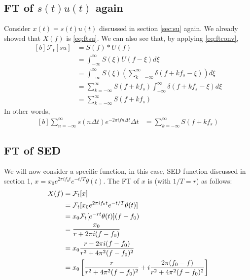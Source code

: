 \documentclass[letterpaper, 11pt]{article}
\newcommand{\fint}{\int_{-\infty}^{\infty}} %
\newcommand{\sed}[2]{#2_{0}e^{2\pi if_{0}#1}e^{-#1/T} \theta (#1)} %
\newcommand{\fsum}[1]{\sum_{#1 = -\infty}^{\infty}} %
\newcommand{\fourier}[2]{\mathcal{F}_{#1}[#2]} %
\newcommand{\conv}[4]{\fint #3(#2)#4(#1 - #2) d#2} %
\numberwithin{equation}{section}
\numberwithin{figure}{section}
\numberwithin{table}{section}
\begin{document}
\subsection{FT of \(s(t)u(t)\) again}
Consider \(x(t) = s(t)u(t)\) discussed in section \ref{sec:su} again. We already showed that \(X(f)\) is \eqref{eq:ftsu}. We can also see that, by applying \eqref{eq:ftconv}, 
\begin{equation}
	\begin{aligned}[b]
		\fourier{t}{su}
		&= S(f)*U(f)\\
		&= \conv{f}{\xi}{S}{U}\\
		&= \fint S(\xi) 
		   \left (\fsum{k} \delta (f + kf_{s}- \xi) \right ) d\xi\\
		&= \fsum{k} S(f + kf_{s}) \fint \delta (f + kf_{s} - \xi) d\xi\\
		&= \fsum{k} S(f + kf_{s}) 
	\end{aligned}
\end{equation}
In other words, 
\begin{equation}
	\begin{aligned}[b]
		\fsum{n} s(n \Delta t) e^{-2\pi ifn\Delta t} \Delta t 
			&= \fsum{k} S(f + kf_{s}) 
			\label{eq:ftsu1}
	\end{aligned}
\end{equation}

\subsection{FT of SED}
We will now consider a specific function, in this case, SED function discussed in section 1, \(x = \sed{t}{x}\). The FT of \(x\) is (with \(1/T = r\)) as follows:
\begin{equation}
	\begin{aligned}[b]
		X(f)	&= \fourier{t}{x}\\
			&= \fourier{t}{\sed{t}{x}}\\
			&= x_{0}\fourier{t}{e^{-rt} \theta (t)}(f - f_{0})\\
			&= \frac{x_{0}}{r + 2\pi i(f - f_{0})} \\
			\gdef\temp{r^2 + 4\pi^{2}(f - f_{0})^2} %
			&= x_{0}\frac{r - 2\pi i(f - f_{0})}{\temp}\\
			&= x_{0}\left[\frac{r}{\temp} + i\frac{2\pi(f_{0} - f)}{\temp} \right]
	\end{aligned}
\end{equation}
\end{document}
